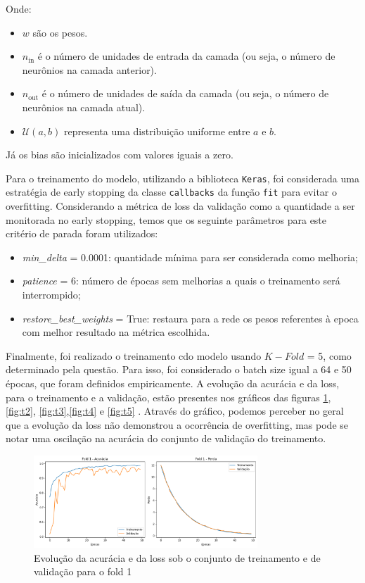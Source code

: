 \documentclass[]{abntex2}
\begin{document}
Onde:
\begin{itemize}
    \item \( w \) são os pesos.
    \item \( n_{\text{in}} \) é o número de unidades de entrada da camada (ou seja, o número de neurônios na camada anterior).
    \item \( n_{\text{out}} \) é o número de unidades de saída da camada (ou seja, o número de neurônios na camada atual).
    \item \( \mathcal{U}(a, b) \) representa uma distribuição uniforme entre \( a \) e \( b \).
\end{itemize}

Já os bias são inicializados com valores iguais a zero.

Para o treinamento do modelo, utilizando a biblioteca \texttt{Keras}, foi considerada uma estratégia de early stopping da classe \texttt{callbacks} da função \texttt{fit} para evitar o overfitting. Considerando a métrica de loss da validação como a quantidade a ser monitorada no early stopping, temos que os seguinte parâmetros para este critério de parada foram utilizados:

\begin{itemize}
    \item \textit{min\_delta} = 0.0001:  quantidade mínima para ser considerada como melhoria;
    \item \textit{patience} = 6: número de épocas sem melhorias a quais o treinamento será interrompido;
    \item \textit{restore\_best\_weights} = True: restaura para a rede os pesos referentes à epoca com melhor resultado na métrica escolhida.
\end{itemize}

Finalmente, foi realizado o treinamento cdo modelo usando $K-Fold$ = 5, como determinado pela questão. Para isso, foi considerado o batch size igual a 64 e 50 épocas, que foram definidos empiricamente. A evolução da acurácia e da loss, para o treinamento e a validação, estão presentes nos gráficos das figuras \ref{fig:t1}, \ref{fig:t2}, \ref{fig:t3},\ref{fig:t4} e \ref{fig:t5} . Através do gráfico, podemos perceber no geral que a evolução da loss não demonstrou a ocorrência de overfitting, mas pode se notar uma oscilação na acurácia do conjunto de validação do treinamento.

\begin{figure}[H]
    \centering 
    \includegraphics[width=0.75\textwidth]{imgs/ex2/train_f1.png}
    \caption{Evolução da acurácia e da loss sob o conjunto de treinamento e de validação para o fold 1}
    \label{fig:t1} %
\end{figure}
\end{document}
